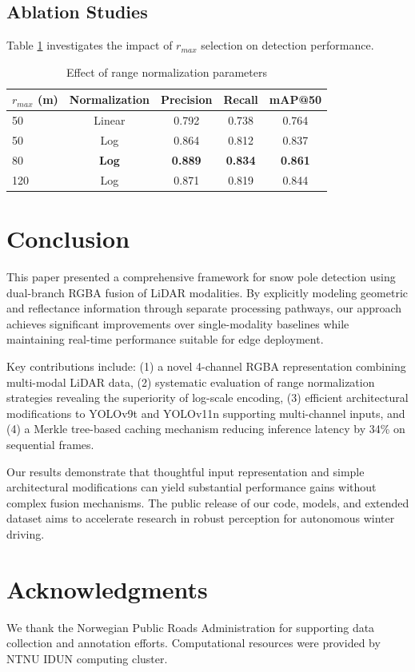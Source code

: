 \documentclass[runningheads]{llncs}
\begin{document}
\subsection{Ablation Studies}

Table \ref{tab:range_ablation} investigates the impact of $r_{max}$ selection on detection performance.

\begin{table}[h]
\centering
\caption{Effect of range normalization parameters}
\label{tab:range_ablation}
\begin{tabular}{lcccc}
\toprule
\textbf{$r_{max}$ (m)} & \textbf{Normalization} & \textbf{Precision} & \textbf{Recall} & \textbf{mAP@50} \\
\midrule
50 & Linear & 0.792 & 0.738 & 0.764 \\
50 & Log & 0.864 & 0.812 & 0.837 \\
\rowcolor{bestgreen!20}
80 & \textbf{Log} & \textbf{0.889} & \textbf{0.834} & \textbf{0.861} \\
120 & Log & 0.871 & 0.819 & 0.844 \\
\bottomrule
\end{tabular}
\end{table}

\section{Conclusion}

This paper presented a comprehensive framework for snow pole detection using dual-branch RGBA fusion of LiDAR modalities. By explicitly modeling geometric and reflectance information through separate processing pathways, our approach achieves significant improvements over single-modality baselines while maintaining real-time performance suitable for edge deployment.

Key contributions include: (1) a novel 4-channel RGBA representation combining multi-modal LiDAR data, (2) systematic evaluation of range normalization strategies revealing the superiority of log-scale encoding, (3) efficient architectural modifications to YOLOv9t and YOLOv11n supporting multi-channel inputs, and (4) a Merkle tree-based caching mechanism reducing inference latency by 34\% on sequential frames.

Our results demonstrate that thoughtful input representation and simple architectural modifications can yield substantial performance gains without complex fusion mechanisms. The public release of our code, models, and extended dataset aims to accelerate research in robust perception for autonomous winter driving.

\section*{Acknowledgments}

We thank the Norwegian Public Roads Administration for supporting data collection and annotation efforts. Computational resources were provided by NTNU IDUN computing cluster.



\end{document}
